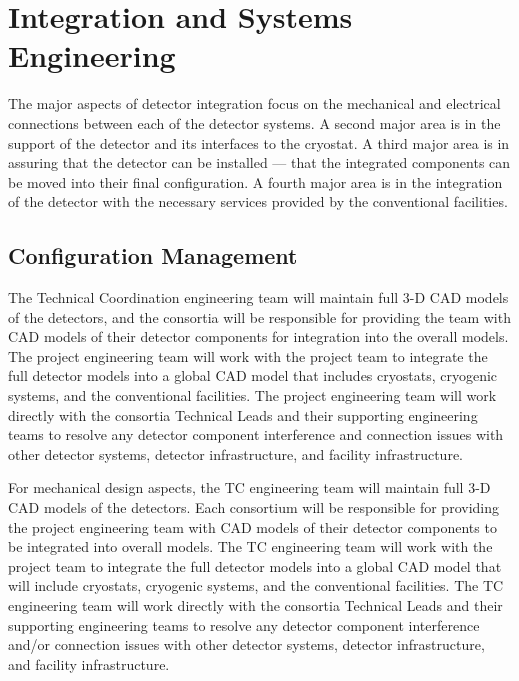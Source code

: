 \section{Integration and Systems Engineering }
\label{sec:fdsp-coord-integ-sysengr}

The major aspects of detector integration focus on the mechanical and
electrical connections between each of the detector systems. A second
major area is in the support of the detector and its interfaces to the
cryostat. A third major area is in assuring that the detector can be
installed --- that the integrated components can be moved into their
final configuration. A fourth major area is in the integration of the
detector with the necessary services provided by the conventional
facilities.

\subsection{Configuration Management}
\label{sec:fdsp-coord-integ-config}

The  Technical Coordination engineering team will maintain
full 3-D CAD models of the detectors, and the consortia will be
responsible for providing the team with CAD models of their detector
components for integration into the overall models.  The project
engineering team will work with the  project team to integrate the
full detector models into a global  CAD model that includes
cryostats, cryogenic systems, and the conventional facilities.  The
 project engineering team will work directly with the consortia
Technical Leads and their supporting engineering teams to resolve any
detector component interference and connection issues with other
detector systems, detector infrastructure, and facility
infrastructure.

For mechanical design aspects, the  TC 
engineering team will maintain full 3-D CAD models of the detectors.
Each consortium will be responsible for providing the project
engineering team with CAD models of their detector components to be
integrated into overall models.  The TC engineering team will
work with the  project team to integrate the full detector models
into a global  CAD model that will include cryostats, cryogenic
systems, and the conventional facilities.  The TC
engineering team will work directly with the consortia Technical Leads
and their supporting engineering teams to resolve any detector
component interference and/or connection issues with other detector
systems, detector infrastructure, and facility infrastructure.

